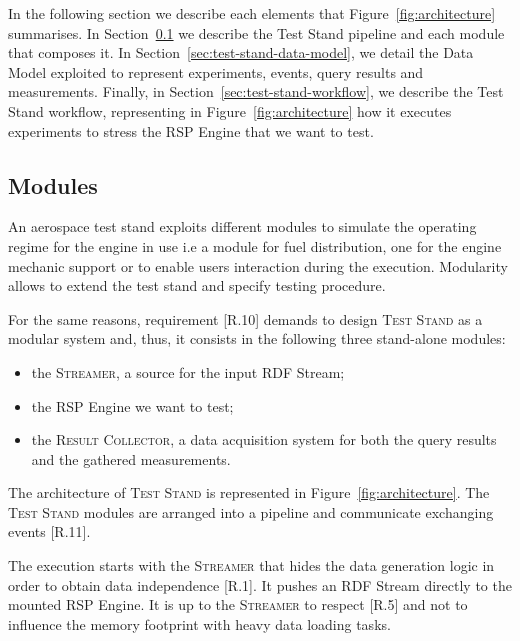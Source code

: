 
In the following section we describe each elements that Figure~\ref{fig:architecture} summarises. In Section~\ref{sec:modules} we describe the Test Stand pipeline and each module that composes it. In Section~\ref{sec:test-stand-data-model}, we detail the Data Model exploited to represent experiments, events, query results and measurements. Finally, in Section~\ref{sec:test-stand-workflow}, we describe the Test Stand workflow, representing in Figure~\ref{fig:architecture} how it executes experiments to stress the RSP Engine that we want to test.

\subsection{Modules}\label{sec:modules}

\noindent An aerospace test stand exploits different modules to simulate the operating regime for the engine in use  i.e a module for fuel distribution, one for the engine mechanic support or to enable users interaction during the execution. Modularity allows to extend the test stand and specify testing procedure. 

For the same reasons, requirement [R.10] demands to design \name \textsc{Test Stand} as a modular system and, thus, it consists in the following three stand-alone modules:
\begin{itemize}
\item the \textsc{Streamer}, a source for the input RDF Stream;
\item the RSP Engine we want to test;
\item the \textsc{Result Collector}, a data acquisition system for both the query results and the gathered measurements.
\end{itemize}

\noindent The architecture of \name \textsc{Test Stand} is represented in Figure~\ref{fig:architecture}. The \textsc{Test Stand} modules are arranged into a pipeline and communicate exchanging events [R.11]. %

The execution starts with the \textsc{Streamer} that hides the data generation logic in order to obtain data independence [R.1]. It pushes an RDF Stream directly to the mounted RSP Engine. It is up to the \textsc{Streamer} to respect [R.5] and not to influence the memory footprint with heavy data loading tasks. 

